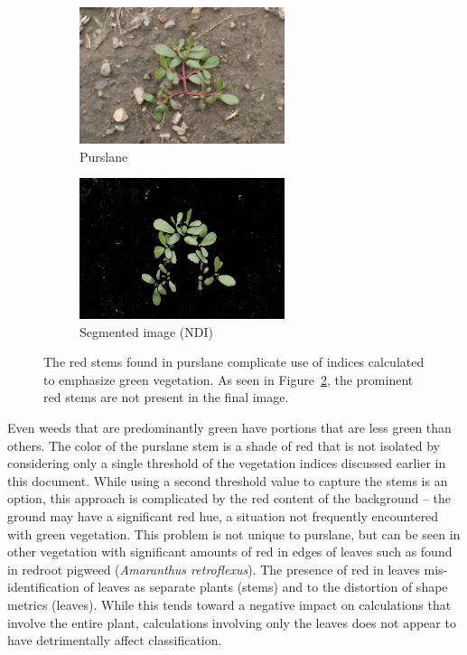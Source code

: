 \documentclass[letterpaper]{article}
\begin{document}
{\begin{figure}[h!]
	\centering
	\begin{subfigure}[h]{.40\textwidth}
		\centering
		\includegraphics[width=6cm]{./figures/purslane.png}
		\caption{Purslane}
		\label{fig:purslane}
	\end{subfigure}
	\begin{subfigure}[h]{.40\textwidth}
		\centering
		\includegraphics[width=6cm]{./figures/purslane-segmented.jpg}
		\caption{Segmented image (NDI)}
		\label{fig:purslane-segmented}
	\end{subfigure}
	\caption[Color problems complicate segmentation]{The red stems found in purslane complicate use of indices calculated to emphasize green vegetation. As seen in Figure~\ref{fig:purslane-segmented}, the prominent red stems are not present in the final image.}
	\label{fig:segmentation-problem}
\end{figure}

Even weeds that are predominantly green have portions that are less green than others. The color of the purslane stem is a shade of red that is not isolated by considering only a single threshold of the vegetation indices discussed earlier in this document. While using a second threshold value to capture the stems is an option, this approach is complicated by the red content of the background -- the ground may have a significant red hue, a situation not frequently encountered with green vegetation. This problem is not unique to purslane, but can be seen in other vegetation with significant amounts of red in edges of leaves such as found in redroot pigweed (\textit{Amaranthus retroflexus}).  The presence of red in leaves mis-identification of leaves as separate plants (stems) and to the distortion of shape metrics (leaves). While this tends toward a negative impact on calculations that involve the entire plant, calculations involving only the leaves does not appear to have detrimentally affect classification.

}
\end{document}
